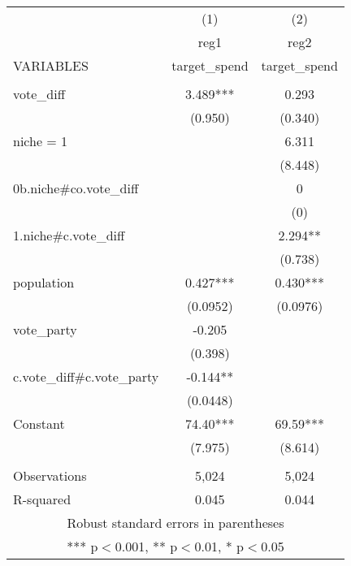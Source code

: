 \documentclass[]{article}
\begin{document}
\begin{tabular}{lcc} \hline
 & (1) & (2) \\
 & reg1 & reg2 \\
VARIABLES & target\_spend & target\_spend \\ \hline
 &  &  \\
vote\_diff & 3.489*** & 0.293 \\
 & (0.950) & (0.340) \\
niche = 1 &  & 6.311 \\
 &  & (8.448) \\
0b.niche\#co.vote\_diff &  & 0 \\
 &  & (0) \\
1.niche\#c.vote\_diff &  & 2.294** \\
 &  & (0.738) \\
population & 0.427*** & 0.430*** \\
 & (0.0952) & (0.0976) \\
vote\_party & -0.205 &  \\
 & (0.398) &  \\
c.vote\_diff\#c.vote\_party & -0.144** &  \\
 & (0.0448) &  \\
Constant & 74.40*** & 69.59*** \\
 & (7.975) & (8.614) \\
 &  &  \\
Observations & 5,024 & 5,024 \\
 R-squared & 0.045 & 0.044 \\ \hline
\multicolumn{3}{c}{ Robust standard errors in parentheses} \\
\multicolumn{3}{c}{ *** p$<$0.001, ** p$<$0.01, * p$<$0.05} \\
\end{tabular}
\end{document}
